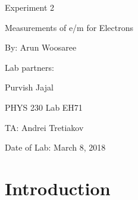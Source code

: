 \documentclass[letterpaper]{article}
\begin{document}
  \begin{titlepage}
    \begin{center}
        \vspace*{1cm}
        \Huge
        Experiment 2
        \vspace{1cm}

        Measurements of e/m for Electrons
        \vspace{1cm}

        By: Arun Woosaree
        \vspace{1cm}

        Lab partners:
        \vspace{.25cm}
        \Large

        Purvish Jajal


        \Huge
        PHYS 230 Lab EH71
        \vspace{1cm}

        TA: Andrei Tretiakov
        \vspace{1cm}

        Date of Lab: March 8, 2018%
        \vfill
    \end{center}
\end{titlepage}

\section{Introduction}
\end{document}

